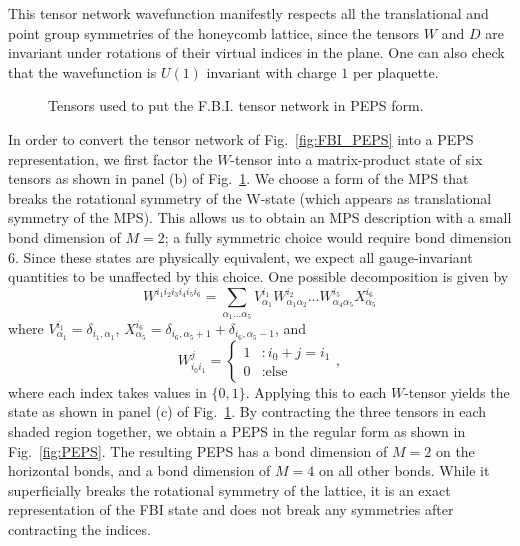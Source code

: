 This tensor network wavefunction manifestly respects all the
translational and point group symmetries of the honeycomb lattice,
since the tensors $W$ and $D$ are invariant under rotations of their
virtual indices in the plane. One can also check that the
wavefunction is $U(1)$ invariant with charge $1$ per plaquette.

\begin{figure}
	\centering
	\quad
\caption{Tensors used to put the F.B.I. tensor network in PEPS form. }
\label{fig:FBI_PEPS_2}
\end{figure}

In order to convert the tensor network of Fig.~\ref{fig:FBI_PEPS} into a PEPS representation,
we first factor the $W$-tensor into a matrix-product state
of six tensors as shown in panel (b) of Fig.~\ref{fig:FBI_PEPS_2}. We
choose a form of the MPS that breaks the rotational symmetry
of the W-state (which appears as translational symmetry of the MPS).
This allows us to obtain an MPS description with a small bond dimension
of $M=2$; a fully symmetric choice would require bond dimension 6.
Since these states are physically equivalent, we expect all
gauge-invariant quantities to be unaffected by this choice.
One possible decomposition is given by
\begin{equation}
W^{i_1 i_2 i_3 i_4 i_5 i_6} = \sum\limits_{\alpha_1 \ldots \alpha_5} V^{i_1}_{\alpha_1} W^{i_2}_{\alpha_1 \alpha_2}
\ldots
W^{i_5}_{\alpha_4 \alpha_5} X^{i_6}_{\alpha_5}
\end{equation}
where $V^{i_1}_{\alpha_1} = \delta_{i_1, \alpha_1}$, $X^{i_6}_{\alpha_5} = \delta_{i_6,\alpha_5+1}+\delta_{i_6,\alpha_5-1}$, and
\begin{equation*}
W_{i_0 i_1}^{j}  = \left\{ \begin{array}{ll}
													1  &:  i_0+j=i_1 \\
													0  &:  \text{else}
													\end{array}
											\right.,
\end{equation*}
where each index takes values in $\{0, 1\}$. Applying this to each
$W$-tensor yields the state as shown in panel (c) of
Fig.~\ref{fig:FBI_PEPS_2}. By contracting the three tensors in each
shaded region together, we obtain a PEPS in the regular form as shown
in Fig.~\ref{fig:PEPS}. The resulting PEPS has a bond dimension of
$M=2$ on the horizontal bonds, and a bond dimension of $M=4$ on all
other bonds. While it superficially breaks
the rotational symmetry of the lattice, it is an exact representation
of the FBI state and does not break any symmetries after contracting
the indices.

